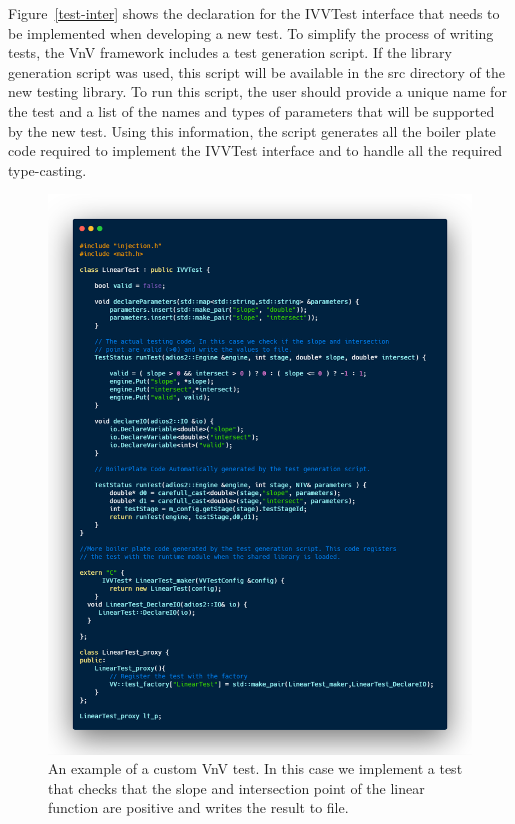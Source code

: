 Figure~\ref{test-inter} shows the declaration for the IVVTest interface that needs to be implemented when developing a new test. To simplify the process of writing tests, the VnV framework includes a test generation script. If the library generation script was used, this script will be available in the src directory of the new testing library. To run this script, the user should provide a unique name for the test and a list of the names and types of parameters that will be supported by the new test. Using this information, the script generates all the boiler plate code required to implement the IVVTest interface and to handle all the required type-casting. 


\begin{figure}
 \includegraphics[height=0.9\textheight, width=\textwidth]{./Figures/test-examp.png}
 \caption{An example of a custom VnV test. In this case we implement a test that checks that the slope and intersection point of the linear function are positive and writes
 the result to file. \label{test-examp}}
\end{figure}


